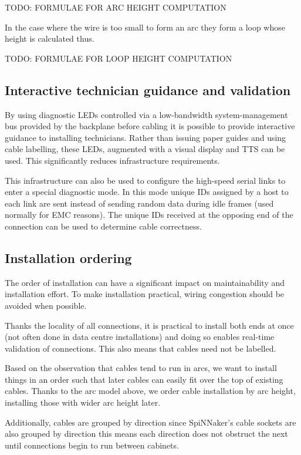 			TODO: FORMULAE FOR ARC HEIGHT COMPUTATION
			
			In the case where the wire is too small to form an arc they form a loop
			whose height is calculated thus.
			
			TODO: FORMULAE FOR LOOP HEIGHT COMPUTATION
		
		\subsection{Interactive technician guidance and validation}
			
			By using diagnostic LEDs controlled via a low-bandwidth system-management
			bus provided by the backplane before cabling it is possible to provide
			interactive guidance to installing technicians. Rather than issuing paper
			guides and using cable labelling, these LEDs, augmented with a visual
			display and TTS can be used. This significantly reduces infrastructure
			requirements.
			
			This infrastructure can also be used to configure the high-speed serial
			links to enter a special diagnostic mode. In this mode unique IDs
			assigned by a host to each link are sent instead of sending random data
			during idle frames (used normally for EMC reasons). The unique IDs
			received at the opposing end of the connection can be used to determine
			cable correctness.
		
		\subsection{Installation ordering}
			
			The order of installation can have a significant impact on
			maintainability and installation effort. To make installation practical,
			wiring congestion should be avoided when possible.
			
			Thanks the locality of all connections, it is practical to install both
			ends at once (not often done in data centre installations) and doing so
			enables real-time validation of connections. This also means that cables
			need not be labelled.
			
			Based on the observation that cables tend to run in arcs, we want to
			install things in an order such that later cables can easily fit over the
			top of existing cables. Thanks to the arc model above, we order cable
			installation by arc height, installing those with wider arc height later.
			
			Additionally, cables are grouped by direction since SpiNNaker's cable
			sockets are also grouped by direction this means each direction does not
			obstruct the next until connections begin to run between cabinets.
			
